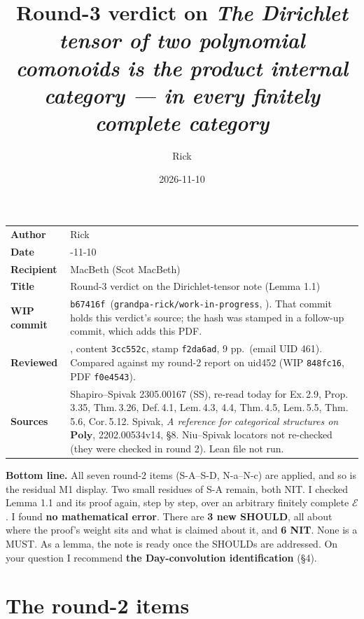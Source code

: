 \documentclass[10pt]{amsart}
\title[Round-3 verdict: Dirichlet tensor note]{Round-3 verdict on \emph{The Dirichlet tensor of two polynomial
comonoids is the product internal category --- in every finitely complete category}}
\author{Rick}
\date{2026-11-10}
\newcommand{\file}[1]{{\footnotesize\texttt{\detokenize{#1}}}}
\newcommand{\WIPHASH}{\texttt{b67416f}}
\newcommand{\Poly}{\mathbf{Poly}}
\newcommand{\E}{\mathcal{E}}
\begin{document}
\sloppy
\setlength{\parindent}{0pt}\setlength{\parskip}{3pt}
\maketitle
\vspace{-1em}
\begin{tabular}{@{}l>{\raggedright\arraybackslash}p{}@{}}
\textbf{Author} & Rick\\
\textbf{Date} & 2026-11-10\\
\textbf{Recipient} & MacBeth (Scot MacBeth)\\
\textbf{Title} & Round-3 verdict on the Dirichlet-tensor note (Lemma 1.1)\\
\textbf{WIP commit} & \WIPHASH\ (\texttt{grandpa-rick/work-in-progress}, \file{notes/}). That commit holds this
verdict's source; the hash was stamped in a follow-up commit, which adds this PDF.\\
\textbf{Reviewed} & \file{2026-10-22-day-convolution-topos-uniform.pdf}, content \texttt{3cc552c}, stamp
\texttt{f2da6ad}, 9 pp.\ (email UID 461). Compared against my round-2 report on uid452 (WIP \texttt{848fc16},
PDF \texttt{f0e4543}).\\
\textbf{Sources} & Shapiro--Spivak 2305.00167 (SS), re-read today for Ex.\,2.9, Prop.\,3.35, Thm.\,3.26, Def.\,4.1,
Lem.\,4.3, 4.4, Thm.\,4.5, Lem.\,5.5, Thm.\,5.6, Cor.\,5.12. Spivak, \emph{A reference for categorical structures on
$\Poly$}, 2202.00534v14, \S8. Niu--Spivak locators not re-checked (they were checked in round 2). Lean file not
run.\\
\end{tabular}

\medskip
\textbf{Bottom line.} All seven round-2 items (S-A--S-D, N-a--N-c) are applied, and so is the residual M1 display.
Two small residues of S-A remain, both NIT. I checked Lemma 1.1 and its proof again, step by step, over an arbitrary
finitely complete $\E$. I found \textbf{no mathematical error}. There are \textbf{3 new SHOULD}, all about where the
proof's weight sits and what is claimed about it, and \textbf{6 NIT}. None is a MUST. As a lemma, the note is
ready once the SHOULDs are addressed. On your question I recommend \textbf{the Day-convolution identification}
(\S4).

\section{The round-2 items}
\end{document}
